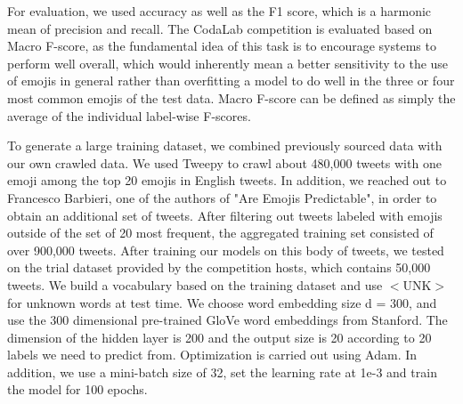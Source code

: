 \documentclass[11pt,a4paper]{article}
\begin{document}
For evaluation, we used accuracy as well as the F1 score, which is a harmonic mean of precision and recall. The CodaLab competition is evaluated based on Macro F-score, as the fundamental idea of this task is to encourage systems to perform well overall, which would inherently mean a better sensitivity to the use of emojis in general rather than overfitting a model to do well in the  three or four most common emojis of the test data. Macro F-score can be defined as simply the average of the individual label-wise F-scores.


\par
To generate a large training dataset, we combined previously sourced data with our own crawled data. We used Tweepy to crawl about 480,000 tweets with one emoji among the top 20 emojis in English tweets. In addition, we reached out to Francesco Barbieri, one of the authors of "Are Emojis Predictable", in order to obtain an additional set of tweets. After filtering out tweets labeled with emojis outside of the set of 20 most frequent, the aggregated training set consisted of over 900,000 tweets. After training our models on this body of tweets, we tested on the trial dataset provided by the competition hosts, which contains 50,000 tweets. We build a vocabulary based on the training dataset and use $<$UNK$>$ for unknown words at test time. We choose word embedding size d = 300, and use the 300 dimensional pre-trained GloVe word embeddings from Stanford. The dimension of the hidden layer is 200 and the output size is 20 according to 20 labels we need to predict from. Optimization is carried out using Adam. In addition, we use a mini-batch size of 32, set the learning rate at 1e-3 and train the model for 100 epochs.
\end{document}

